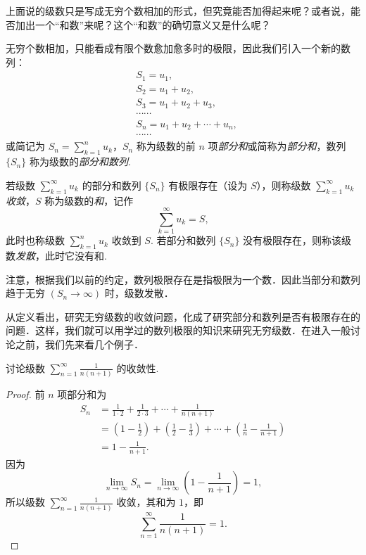 上面说的级数只是写成无穷个数相加的形式，但究竟能否加得起来呢？或者说，能否加出一个``和数''来呢？这个``和数''的确切意义又是什么呢？

无穷个数相加，只能看成有限个数愈加愈多时的极限，因此我们引入一个新的数列：
\[
\begin{aligned}
&S_{1}=u_{1},\\
&S_{2}=u_{1}+u_{2},\\
&S_{3}=u_{1}+u_{2}+u_{3},\\
&\cdots\cdots\\
&S_{n}=u_{1}+u_{2}+\cdots+u_{n},\\
&\cdots\cdots
\end{aligned}
\]
或简记为 $S_{n}=\sum_{k=1}^{n}u_{k}$，$S_{n}$ 称为级数的前 $n$ 项\emph{部分和}或简称为\emph{部分和}，数列 $\{S_{n}\}$ 称为级数的\emph{部分和数列}.

\begin{definition}\label{def:10-1}
若级数 $\sum_{k=1}^{\infty}u_{k}$ 的部分和数列 $\{S_{n}\}$ 有极限存在（设为 $S$），则称级数 $\sum_{k=1}^{\infty}u_{k}$ \emph{收敛}，$S$ 称为级数的\emph{和}，记作
\[
\sum_{k=1}^{\infty}u_{k}=S,
\]
此时也称级数 $\sum_{k=1}^{n}u_{k}$ 收敛到 $S$. 若部分和数列 $\{S_{n}\}$ 没有极限存在，则称该级数\emph{发散}，此时它没有和.
\end{definition}

注意，根据我们以前的约定，数列极限存在是指极限为一个数．因此当部分和数列趋于无穷 $(S_{n}\to\infty)$ 时，级数发散．

从定义看出，研究无穷级数的收敛问题，化成了研究部分和数列是否有极限存在的问题．这样，我们就可以用学过的数列极限的知识来研究无穷级数．在进入一般讨论之前，我们先来看几个例子．

\begin{example}\label{ex:10-2-1}
讨论级数 $\displaystyle\sum_{n=1}^{\infty}\frac{1}{n(n+1)}$ 的收敛性.
\end{example}

\begin{proof}
前 $n$ 项部分和为
\[
\begin{aligned}
S_{n}&=\frac{1}{1\cdot2}+\frac{1}{2\cdot3}+\cdots+\frac{1}{n(n+1)}\\
&=\left(1-\frac{1}{2}\right)+\left(\frac{1}{2}-\frac{1}{3}\right)+\cdots+\left(\frac{1}{n}-\frac{1}{n+1}\right)\\
&=1-\frac{1}{n+1}.
\end{aligned}
\]
因为
\[
\lim_{n\to\infty}S_{n}=\lim_{n\to\infty}\left(1-\frac{1}{n+1}\right)=1,
\]
所以级数 $\displaystyle\sum_{n=1}^{\infty}\frac{1}{n(n+1)}$ 收敛，其和为 $1$，即
\[
\sum_{n=1}^{\infty}\frac{1}{n(n+1)}=1.
\]
\end{proof}

